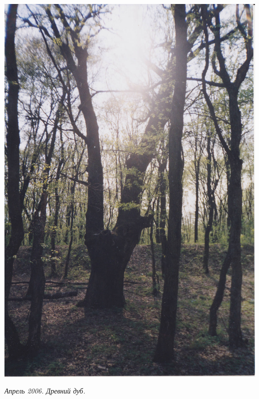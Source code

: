 \begin{center}
\includegraphics[width=\textwidth]{chast-lys-gory/zazver/stardub02.jpg}

\textit{Апрель 2006. Древний дуб.}
\end{center}
\vspace*{\fill}

\newpage
\vspace*{\fill}

